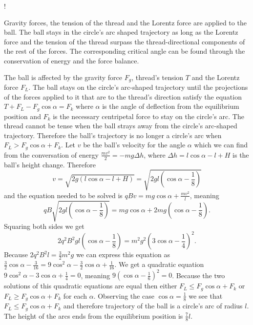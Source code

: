 {\begin{center}
\begin{resizebox}{0.5\linewidth}{!}
{}
\end{resizebox}
\end{center}
\fi


\ifEngHint
Gravity forces, the tension of the thread and the Lorentz force are applied to the ball. The ball stays in the circle’s arc shaped trajectory as long as the Lorentz force and the tension of the thread surpass the thread-directional components of the rest of the forces. The corresponding critical angle can be found through the conservation of energy and the force balance.
\fi


\ifEngSolution
The ball is affected by the gravity force $F_g$, thread’s tension $T$ and the Lorentz force $F_L$. The ball stays on the circle’s arc-shaped trajectory until the projections of the forces applied to it that are to the thread’s direction satisfy the equation $T+F_L-F_g\cos\alpha=F_k$ where $\alpha$ is the angle of deflection from the equilibrium position and $F_k$ is the necessary centripetal force to stay on the circle’s arc. The thread cannot be tense when the ball strays away from the circle’s arc-shaped trajectory. Therefore the ball’s trajectory is no longer a circle’s arc when $F_L>F_g\cos\alpha+F_k$. Let $v$ be the ball’s velocity for the angle $\alpha$ which we can find from the conversation of energy $\frac{mv^2}{2}=-mg\Delta h$, where $\Delta h=l\cos\alpha-l+H$ is the ball’s height change. Therefore 
\[
v=\sqrt{2g\left(l\cos\alpha-l+H\right)}=\sqrt{2gl\left(\cos\alpha-\frac{1}{8}\right)}
\]
and the equation needed to be solved is $qBv=mg\cos\alpha+\frac{mv^2}{l}$, meaning
\[
qB\sqrt{2gl\left(\cos\alpha-\frac{1}{8}\right)}=mg\cos\alpha+2mg\left(\cos\alpha-\frac{1}{8}\right).
\]
Squaring both sides we get
\[
2q^2B^2gl\left(\cos\alpha-\frac{1}{8}\right)=m^2g^2\left(3\cos\alpha-\frac{1}{4}\right)^2.
\]
Because $2q^2B^2l=\frac{3}{2}m^2g$ we can express this equation as $\frac{3}{2}\cos\alpha-\frac{3}{16}=9\cos^2\alpha-\frac{3}{2}\cos\alpha+\frac{1}{16}$. We get a quadratic equation $9\cos^2\alpha-3\cos\alpha+\frac{1}{4}=0$, meaning $9\left(\cos\alpha-\frac{1}{6}\right)^2=0$. Because the two solutions of this quadratic equations are equal then either $F_L\leq F_g\cos\alpha+F_k$ or $F_L\geq F_g\cos\alpha+F_k$ for each $\alpha$. Observing the case $\cos\alpha=\frac{1}{8}$ we see that $F_L\leq F_g\cos\alpha+F_k$ and therefore trajectory of the ball is a circle’s arc of radius $l$. The height of the arcs ends from the equilibrium position is $\frac{7}{8}l$.
\fi
}